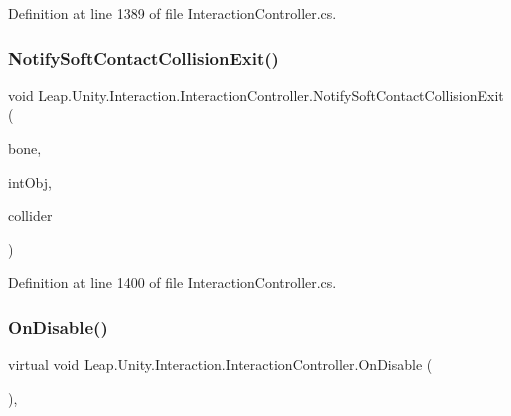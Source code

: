 Definition at line 1389 of file Interaction\+Controller.\+cs.

\mbox{\label{class_leap_1_1_unity_1_1_interaction_1_1_interaction_controller_a3cbc9651adc83ff8012cad6fa299beaf}} 
\subsubsection{\texorpdfstring{NotifySoftContactCollisionExit()}{NotifySoftContactCollisionExit()}}
{\footnotesize\ttfamily void Leap.\+Unity.\+Interaction.\+Interaction\+Controller.\+Notify\+Soft\+Contact\+Collision\+Exit (\begin{DoxyParamCaption}\item[{\mbox{\hyperlink{class_leap_1_1_unity_1_1_interaction_1_1_contact_bone}{Contact\+Bone}}}]{bone,  }\item[{\mbox{\hyperlink{interface_leap_1_1_unity_1_1_interaction_1_1_i_interaction_behaviour}{I\+Interaction\+Behaviour}}}]{int\+Obj,  }\item[{Collider}]{collider }\end{DoxyParamCaption})}



Definition at line 1400 of file Interaction\+Controller.\+cs.

\mbox{\label{class_leap_1_1_unity_1_1_interaction_1_1_interaction_controller_a426c454683c1da5fefe1469a5f0f29e4}} 
\subsubsection{\texorpdfstring{OnDisable()}{OnDisable()}}
{\footnotesize\ttfamily virtual void Leap.\+Unity.\+Interaction.\+Interaction\+Controller.\+On\+Disable (\begin{DoxyParamCaption}{ }\end{DoxyParamCaption})\hspace{0.3cm}{\ttfamily [protected]}, {\ttfamily [virtual]}}



